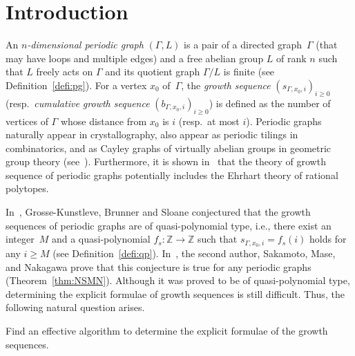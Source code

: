 \section{Introduction}

An \textit{$n$-dimensional periodic graph} $(\Gamma, L)$ is a pair of a directed graph~$\Gamma$ (that may have loops and multiple edges) and a free abelian group $L$ of rank $n$ such that $L$ freely acts on $\Gamma$ and its quotient graph $\Gamma/L$ is finite (see Definition~\ref{defi:pg}). 
For a vertex $x_0$ of~$\Gamma$, the \textit{growth sequence} $(s_{\Gamma, x_0, i})_{i \ge 0}$ 
(resp.\ \textit{cumulative growth sequence} $(b_{\Gamma, x_0, i})_{i \ge 0}$) is defined as the number of vertices of $\Gamma$ whose distance from $x_0$ is $i$ (resp.\ at most $i$). 
Periodic graphs naturally appear in crystallography, also appear as periodic tilings in combinatorics, and as Cayley graphs of virtually abelian groups in geometric group theory (see~\cite[Section 13]{GS19}). 
Furthermore, it is shown in~\cite{IN} that the theory of growth sequence of periodic graphs potentially includes the Ehrhart theory of rational polytopes. 

In~\cite{GKBS96}, Grosse-Kunstleve, Brunner and Sloane conjectured 
that the growth sequences of periodic graphs are of quasi-polynomial type, i.e., 
there exist an integer~$M$ and a quasi-polynomial $f_s: \mathbb{Z} \to \mathbb{Z}$ such that 
$s_{\Gamma, x_0, i} = f_s(i)$ holds for any $i \ge M$ (see Definition~\ref{defi:qp}). 
In~\cite{NSMN21}, the second author, Sakamoto, Mase, and Nakagawa prove that this conjecture is true for any periodic graphs (Theorem~\ref{thm:NSMN}). 
Although it was proved to be of quasi-polynomial type, determining the explicit formulae of growth sequences is still difficult. 
Thus, the following natural question arises. 

\begin{quest}[{cf.\ \cite[Question 1.1]{IN}}]\label{quest:algorithm}
Find an effective algorithm to determine the explicit formulae of the growth sequences.
\end{quest}

